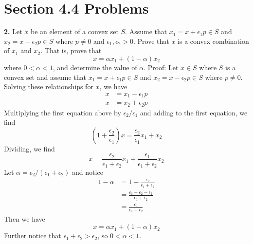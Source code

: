 \documentclass{article}
\begin{document}
\section*{Section 4.4 Problems}
\textbf{2.} Let $x$ be an element of a convex set $S$. Assume that $x_1 = x + \epsilon_1p \in S$ and $x_2 = x - \epsilon_2p \in S$ where $p \neq 0$ and $\epsilon_1,\epsilon_2 > 0$. Prove that $x$ is a convex combination of $x_1$ and $x_2$. That is, prove that 
\[x = \alpha x_1 + (1 - \alpha)x_2\]
where $0 < \alpha < 1$, and determine the value of $\alpha$.
\newline\newline
Proof: Let $x \in S$ where $S$ is a convex set and assume that $x_1 = x + \epsilon_1 p \in S$ and $x_2 = x - \epsilon_2p \in S$ where $p \neq 0$. Solving these relationships for $x$, we have
\begin{align*}
    x &= x_1 - \epsilon_1p\\
    x &= x_2 + \epsilon_2p
\end{align*}
Multiplying the first equation above by $\epsilon_2/\epsilon_1$ and adding to the first equation, we find
\[\left(1 + \frac{\epsilon_2}{\epsilon_1}\right)x = \frac{\epsilon_2}{\epsilon_1}x_1 + x_2\]
Dividing, we find
\[x = \frac{\epsilon_2}{\epsilon_1 + \epsilon_2}x_1 + \frac{\epsilon_1}{\epsilon_1 + \epsilon_2}x_2\]
Let $\alpha = \epsilon_2/(\epsilon_1 + \epsilon_2)$ and notice
\begin{align*}
    1 - \alpha &= 1 - \frac{\epsilon_2}{\epsilon_1 + \epsilon_2} \\
    &= \frac{\epsilon_1 + \epsilon_2 - \epsilon_2}{\epsilon_1 + \epsilon_2}\\
    &= \frac{\epsilon_1}{\epsilon_1 + \epsilon_2}
\end{align*}
Then we have 
\[x = \alpha x_1 + (1- \alpha)x_2\]
Further notice that $\epsilon_1 + \epsilon_2 > \epsilon_2$, so $0 < \alpha < 1$.
\newline\newline
\end{document}
